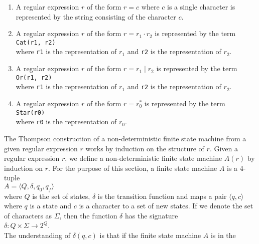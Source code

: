 \begin{enumerate}
\item A regular expression $r$ of the form $r = c$ where $c$ is a single character is
      represented by the string consisting of the character $c$.
\item A regular expression $r$ of the form $r = r_1 \cdot r_2$ is represented by the term
      \\[0.2cm]
      \hspace*{1.3cm}
      \texttt{Cat(r1, r2)}
      \\[0.2cm]
      where \texttt{r1} is the representation of $r_1$ and \texttt{r2} is the
      representation of $r_2$.
\item A regular expression $r$ of the form $r = r_1 \mid r_2$ is represented by the term
      \\[0.2cm]
      \hspace*{1.3cm}
      \texttt{Or(r1, r2)}
      \\[0.2cm]
      where \texttt{r1} is the representation of $r_1$ and \texttt{r2} is the
      representation of $r_2$.
\item A regular expression $r$ of the form $r = r_0^*$ is represented by the term
      \\[0.2cm]
      \hspace*{1.3cm}
      \texttt{Star(r0)}
      \\[0.2cm]
      where \texttt{r0} is the representation of $r_0$.
\end{enumerate}
The Thompson construction of a non-deterministic finite state machine from a given regular
expression $r$ works by induction on the structure of $r$.  Given a regular expression
$r$,  we define a non-deterministic finite state machine $A(r)$ by induction on $r$.
For the purpose of this section, a finite state machine $A$ is a 4-tuple
\\[0.2cm]
\hspace*{1.3cm}
$A = \langle Q, \delta, q_0, q_f \rangle$
\\[0.2cm]
where $Q$ is the set of states, 
$\delta$ is the transition function and maps a pair $\langle q, c \rangle$ where $q$ is a
state and $c$ is a character to a set of new states.  If we denote the set of characters
as $\Sigma$, then the function $\delta$ has the signature
\\[0.2cm]
\hspace*{1.3cm}
$\delta: Q \times \Sigma \rightarrow 2^Q$.
\\[0.2cm]
The understanding  of $\delta(q,c)$ is that if the finite state machine $A$ is in the
